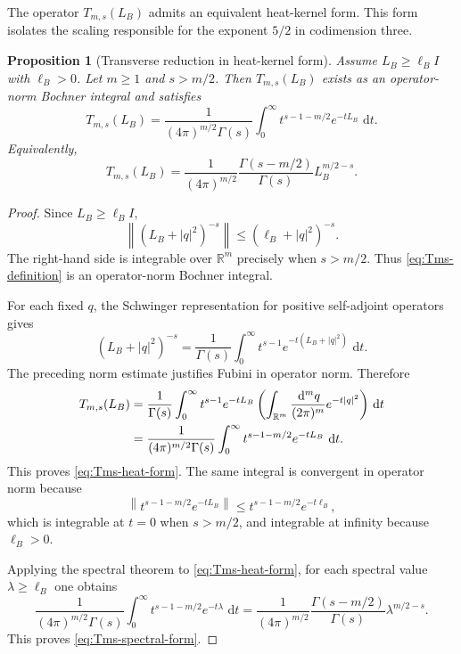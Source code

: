 \documentclass[11pt]{article}
\newtheorem{proposition}[theorem]{Proposition}
\newcommand{\R}{\mathbb{R}}
\newcommand{\dd}{\,\mathrm{d}}
\begin{document}
The operator \(T_{m,s}(L_B)\) admits an equivalent heat-kernel form.  This
form isolates the scaling responsible for the exponent \(5/2\) in
codimension three.

\begin{proposition}[Transverse reduction in heat-kernel form]
\label{prop:Tms-heat-form}
Assume \(L_B\geq \ell_B I\) with \(\ell_B>0\).  Let \(m\geq1\) and
\(s>m/2\).  Then \(T_{m,s}(L_B)\) exists as an operator-norm Bochner
integral and satisfies
\begin{equation}
    T_{m,s}(L_B)
    =
    \frac{1}{(4\pi)^{m/2}\Gamma(s)}
    \int_0^\infty
    t^{s-1-m/2}e^{-tL_B}\,\dd t .
    \label{eq:Tms-heat-form}
\end{equation}
Equivalently,
\begin{equation}
    T_{m,s}(L_B)
    =
    \frac{1}{(4\pi)^{m/2}}
    \frac{\Gamma(s-m/2)}{\Gamma(s)}
    L_B^{m/2-s}.
    \label{eq:Tms-spectral-form}
\end{equation}
\end{proposition}

\begin{proof}
Since \(L_B\geq \ell_B I\),
\[
    \left\|(L_B+|q|^2)^{-s}\right\|
    \leq
    (\ell_B+|q|^2)^{-s}.
\]
The right-hand side is integrable over \(\R^m\) precisely when \(s>m/2\).
Thus \eqref{eq:Tms-definition} is an operator-norm Bochner integral.

For each fixed \(q\), the Schwinger representation for positive
self-adjoint operators gives
\[
    (L_B+|q|^2)^{-s}
    =
    \frac{1}{\Gamma(s)}
    \int_0^\infty
    t^{s-1}e^{-t(L_B+|q|^2)}\,\dd t .
\]
The preceding norm estimate justifies Fubini in operator norm.  Therefore
\begin{align}
    T_{m,s}(L_B)
    &=
    \frac{1}{\Gamma(s)}
    \int_0^\infty
    t^{s-1}e^{-tL_B}
    \left(
        \int_{\R^m}
        \frac{\dd^m q}{(2\pi)^m}
        e^{-t|q|^2}
    \right)
    \dd t                                      \notag\\
    &=
    \frac{1}{(4\pi)^{m/2}\Gamma(s)}
    \int_0^\infty
    t^{s-1-m/2}e^{-tL_B}\,\dd t .
\end{align}
This proves \eqref{eq:Tms-heat-form}.  The same integral is convergent in
operator norm because
\[
    \left\|t^{s-1-m/2}e^{-tL_B}\right\|
    \leq
    t^{s-1-m/2}e^{-t\ell_B},
\]
which is integrable at \(t=0\) when \(s>m/2\), and integrable at infinity
because \(\ell_B>0\).

Applying the spectral theorem to \eqref{eq:Tms-heat-form}, for each
spectral value \(\lambda\geq\ell_B\) one obtains
\[
    \frac{1}{(4\pi)^{m/2}\Gamma(s)}
    \int_0^\infty
    t^{s-1-m/2}e^{-t\lambda}\,\dd t
    =
    \frac{1}{(4\pi)^{m/2}}
    \frac{\Gamma(s-m/2)}{\Gamma(s)}
    \lambda^{m/2-s}.
\]
This proves \eqref{eq:Tms-spectral-form}.
\end{proof}
\end{document}
